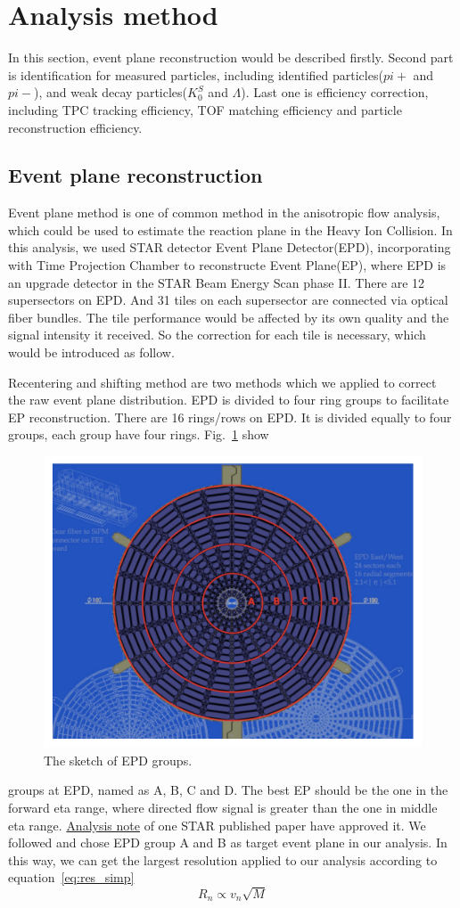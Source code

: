 
\section{Analysis method}
In this section, event plane reconstruction would be described firstly.
Second part is identification for measured particles, including identified particles($pi+$ and $pi-$), 
and weak decay particles($K_0^S$ and $\Lambda$). Last one is efficiency correction, 
including TPC tracking efficiency, TOF matching efficiency and particle reconstruction efficiency.


\subsection{Event plane reconstruction}
Event plane method is one of common method in the anisotropic flow analysis, which could be used to estimate
the reaction plane in the Heavy Ion Collision.\cite{PhysRevC.83.044913} In this analysis, we used STAR detector 
Event Plane Detector(EPD), incorporating with Time Projection Chamber to reconstructe Event Plane(EP), 
where EPD is an upgrade detector in the STAR Beam Energy Scan phase II.\cite{ADAMS2020163970} There are 12 supersectors
on EPD. And 31 tiles on each supersector are connected via optical fiber bundles.
The tile performance would be affected by its own quality and the signal intensity it received.
So the correction for each tile is necessary, which would be introduced as follow.

Recentering and shifting method are two methods which we applied to correct the raw event plane
distribution. EPD is divided to four ring groups to facilitate EP reconstruction. There are 16 rings/rows
on EPD. It is divided equally to four groups, each group have four rings. Fig.~\ref{fig:EPDgroup} show
\begin{figure}[hbt!]
\centering
\includegraphics[width=0.45\linewidth]{figures/chapter02/EPDgroup.png}
\caption{The sketch of EPD groups.}
\label{fig:EPDgroup}
\end{figure}
groups at EPD, named as A, B, C and D. The best EP should be the one in the forward eta range, where directed flow
signal is greater than the one in middle eta range. \href{https://drupal.star.bnl.gov/STAR/system/files/FXT3gev_note_v4.pdf}{Analysis note} of one STAR published paper have approved it. 
We followed and chose EPD group A and B as target event plane in our analysis.
In this way, we can get the largest resolution applied to our analysis according to equation~\ref{eq:res_simp}
\begin{equation}
    R_n \propto v_n \sqrt{M}
\label{eq:res_simp}
\end{equation}

